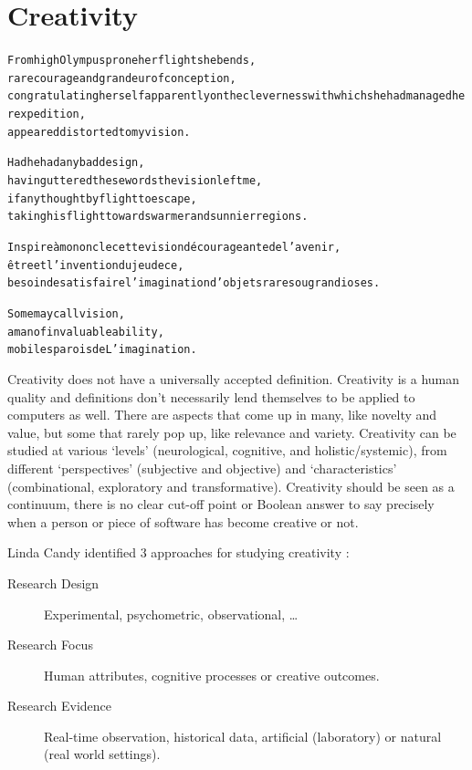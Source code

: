
\chapter{Creativity}
\label{ch:creativity}

\startcontents[chapters]

\vfill

\begin{alltt}\sffamily
From high Olympus prone her flight she bends,
rare courage and grandeur of conception,
congratulating herself apparently on the cleverness with which she had managed her expedition,
appeared distorted to my vision.

Had he had any bad design,
having uttered these words the vision left me,
if any thought by flight to escape,
taking his flight towards warmer and sunnier regions.

Inspire à mon oncle cette vision décourageante de l'avenir,
être et l'invention du jeu de ce,
besoin de satisfaire l'imagination d'objets rares ou grandioses.

Some may call vision,
a man of invaluable ability,
mobiles parois de L'imagination.
\end{alltt}

\newpage
\minicontents
\spirals


Creativity does not have a universally accepted definition. Creativity is a human quality and definitions don't necessarily lend themselves to be applied to computers as well. There are aspects that come up in many, like novelty and value, but some that rarely pop up, like relevance and variety. Creativity can be studied at various `levels' (neurological, cognitive, and holistic/systemic), from different `perspectives' (subjective and objective) and `characteristics' (combinational, exploratory and transformative). Creativity should be seen as a continuum, there is no clear cut-off point or Boolean answer to say precisely when a person or piece of software has become creative or not.

Linda Candy identified 3 approaches for studying creativity \autocite[p.3]{Candy2012}:

\begin{description}
  \item [Research Design] Experimental, psychometric, observational, \ldots
  \item [Research Focus] Human attributes, cognitive processes or creative outcomes.
  \item [Research Evidence] Real-time observation, historical data, artificial (laboratory) or natural (real world settings).
\end{description}

